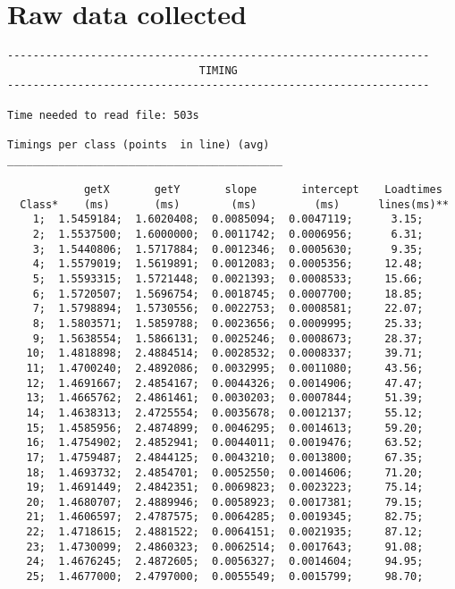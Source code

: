 \newpage

\section{Raw data collected}
\label{appendix:output}
\begin{verbatim}
------------------------------------------------------------------
                              TIMING                              
------------------------------------------------------------------

Time needed to read file: 503s 
 
Timings per class (points  in line) (avg)
___________________________________________

            getX       getY       slope       intercept    Loadtimes
  Class*    (ms)       (ms)        (ms)         (ms)      lines(ms)** 
    1;  1.5459184;  1.6020408;  0.0085094;  0.0047119;      3.15; 
    2;  1.5537500;  1.6000000;  0.0011742;  0.0006956;      6.31; 
    3;  1.5440806;  1.5717884;  0.0012346;  0.0005630;      9.35; 
    4;  1.5579019;  1.5619891;  0.0012083;  0.0005356;     12.48; 
    5;  1.5593315;  1.5721448;  0.0021393;  0.0008533;     15.66; 
    6;  1.5720507;  1.5696754;  0.0018745;  0.0007700;     18.85; 
    7;  1.5798894;  1.5730556;  0.0022753;  0.0008581;     22.07; 
    8;  1.5803571;  1.5859788;  0.0023656;  0.0009995;     25.33; 
    9;  1.5638554;  1.5866131;  0.0025246;  0.0008673;     28.37; 
   10;  1.4818898;  2.4884514;  0.0028532;  0.0008337;     39.71; 
   11;  1.4700240;  2.4892086;  0.0032995;  0.0011080;     43.56; 
   12;  1.4691667;  2.4854167;  0.0044326;  0.0014906;     47.47; 
   13;  1.4665762;  2.4861461;  0.0030203;  0.0007844;     51.39; 
   14;  1.4638313;  2.4725554;  0.0035678;  0.0012137;     55.12; 
   15;  1.4585956;  2.4874899;  0.0046295;  0.0014613;     59.20; 
   16;  1.4754902;  2.4852941;  0.0044011;  0.0019476;     63.52; 
   17;  1.4759487;  2.4844125;  0.0043210;  0.0013800;     67.35; 
   18;  1.4693732;  2.4854701;  0.0052550;  0.0014606;     71.20; 
   19;  1.4691449;  2.4842351;  0.0069823;  0.0023223;     75.14; 
   20;  1.4680707;  2.4889946;  0.0058923;  0.0017381;     79.15; 
   21;  1.4606597;  2.4787575;  0.0064285;  0.0019345;     82.75; 
   22;  1.4718615;  2.4881522;  0.0064151;  0.0021935;     87.12; 
   23;  1.4730099;  2.4860323;  0.0062514;  0.0017643;     91.08; 
   24;  1.4676245;  2.4872605;  0.0056327;  0.0014604;     94.95; 
   25;  1.4677000;  2.4797000;  0.0055549;  0.0015799;     98.70; 


\end{verbatim}
